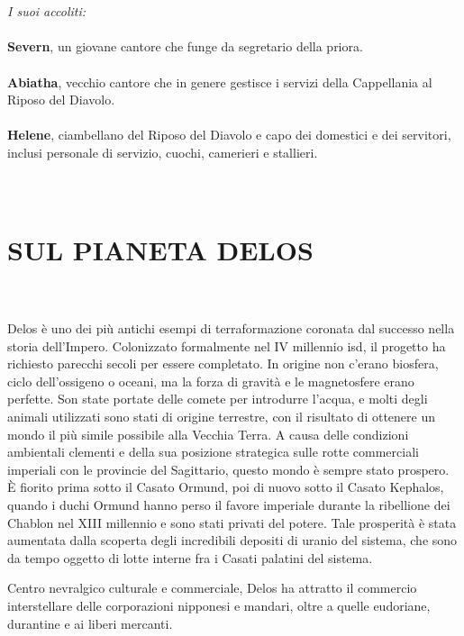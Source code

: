\leavevmode\\
\leavevmode\\
\textit{I suoi accoliti:}
\leavevmode\\
\leavevmode\\
\phantom{123}\textbf{Severn}, un giovane cantore che funge da segretario della
priora.
\leavevmode\\
\leavevmode\\
\phantom{123}\textbf{Abiatha}, vecchio cantore che in genere gestisce i servizi della
Cappellania al Riposo del Diavolo.
\leavevmode\\
\leavevmode\\
\phantom{123}\textbf{Helene}, ciambellano del Riposo del Diavolo e capo dei domestici
e dei servitori, inclusi personale di servizio, cuochi, camerieri e
stallieri.
\leavevmode\\
\leavevmode\\
\leavevmode\\
\section{SUL PIANETA DELOS}
\leavevmode\\
\leavevmode\\
Delos è uno dei più antichi esempi di terraformazione coronata dal
successo nella storia dell'Impero. Colonizzato formalmente nel IV
millennio \foreignlanguage{italian}{isd}, il progetto ha richiesto
parecchi secoli per essere completato. In origine non c'erano biosfera,
ciclo dell'ossigeno o oceani, ma la forza di gravità e le magnetosfere
erano perfette. Son state portate delle comete per introdurre l'acqua, e
molti degli animali utilizzati sono stati di origine terrestre, con il
risultato di ottenere un mondo il più simile possibile alla Vecchia
Terra. A causa delle condizioni ambientali clementi e della sua
posizione strategica sulle rotte commerciali imperiali con le provincie
del {Sagittario}, questo mondo è sempre stato prospero. È fiorito prima
sotto il Casato Ormund, poi di nuovo sotto il Casato Kephalos, quando i
duchi Ormund hanno perso il favore imperiale durante la ribellione dei
Chablon nel XIII millennio e sono stati privati del potere. Tale
prosperità è stata aumentata dalla scoperta degli incredibili depositi
di uranio del sistema, che sono da tempo oggetto di lotte interne fra i
Casati palatini del sistema.

Centro nevralgico culturale e commerciale, Delos ha attratto il
commercio interstellare delle corporazioni nipponesi e mandari, oltre a
quelle eudoriane, durantine e ai liberi mercanti.

